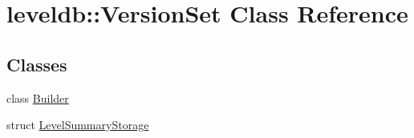 \hypertarget{classleveldb_1_1_version_set}{}\section{leveldb\+::Version\+Set Class Reference}
\label{classleveldb_1_1_version_set}
\subsection*{Classes}
\begin{DoxyCompactItemize}
\item 
class \mbox{\hyperlink{classleveldb_1_1_version_set_1_1_builder}{Builder}}
\item 
struct \mbox{\hyperlink{structleveldb_1_1_version_set_1_1_level_summary_storage}{Level\+Summary\+Storage}}
\end{DoxyCompactItemize}

